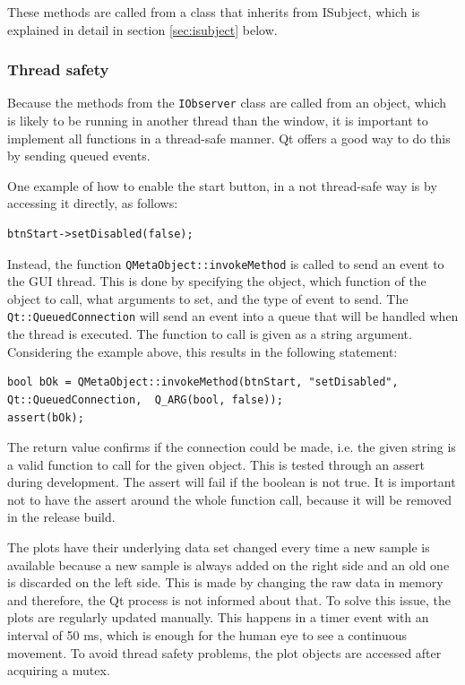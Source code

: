 These methods are called from a class that inherits from ISubject, which is explained in detail in section \ref{sec:isubject} below. 

\subsubsection{Thread safety}
Because the methods from the \texttt{IObserver} class are called from an object, which is likely to be running in another thread than the window, it is important to implement all functions in a thread-safe manner. Qt offers a good way to do this by sending queued events. 

One example of how to enable the start button, in a not thread-safe way is by accessing it directly, as follows: 

\begin{verbatim}  
btnStart->setDisabled(false);
\end{verbatim}

Instead, the function \texttt{QMetaObject::invokeMethod} is called to send an event to the GUI thread. This is done by specifying the object, which function of the object to call, what arguments to set, and the type of event to send. The \texttt{Qt::QueuedConnection} will send an event into a queue that will be handled when the thread is executed. The function to call is given as a string argument. Considering the example above, this results in the following statement:

\begin{verbatim}  
bool bOk = QMetaObject::invokeMethod(btnStart, "setDisabled", Qt::QueuedConnection,  Q_ARG(bool, false));
assert(bOk);
\end{verbatim}

The return value confirms if the connection could be made, i.e. the given string is a valid function to call for the given object. This is tested through an assert during development. The assert will fail if the boolean is not true. It is important not to have the assert around the whole function call, because it will be removed in the release build. 

The plots have their underlying data set changed every time a new sample is available because a new sample is always added on the right side and an old one is discarded on the left side. This is made by changing the raw data in memory and therefore, the Qt process is not informed about that. To solve this issue, the plots are regularly updated manually. This happens in a timer event with an interval of 50 ms, which is enough for the human eye to see a continuous movement. To avoid thread safety problems, the plot objects are accessed after acquiring a mutex.


